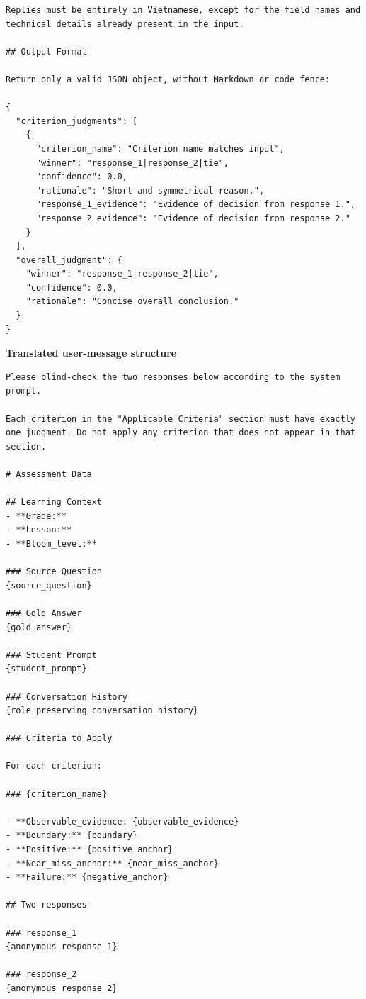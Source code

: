 \documentclass[conference]{IEEEtran}
\begin{document}
\begin{Verbatim}[breaklines=true,breakanywhere=true,fontsize=\footnotesize,formatcom=\rmfamily]
Replies must be entirely in Vietnamese, except for the field names and technical details already present in the input.

## Output Format

Return only a valid JSON object, without Markdown or code fence:

{
  "criterion_judgments": [
    {
      "criterion_name": "Criterion name matches input",
      "winner": "response_1|response_2|tie",
      "confidence": 0.0,
      "rationale": "Short and symmetrical reason.",
      "response_1_evidence": "Evidence of decision from response 1.",
      "response_2_evidence": "Evidence of decision from response 2."
    }
  ],
  "overall_judgment": {
    "winner": "response_1|response_2|tie",
    "confidence": 0.0,
    "rationale": "Concise overall conclusion."
  }
}
\end{Verbatim}
\noindent\textbf{Translated user-message structure}
\begin{Verbatim}[breaklines=true,breakanywhere=true,fontsize=\footnotesize,formatcom=\rmfamily]
Please blind-check the two responses below according to the system prompt.

Each criterion in the "Applicable Criteria" section must have exactly one judgment. Do not apply any criterion that does not appear in that section.

# Assessment Data

## Learning Context
- **Grade:**
- **Lesson:**
- **Bloom_level:**

### Source Question
{source_question}

### Gold Answer
{gold_answer}

### Student Prompt
{student_prompt}

### Conversation History
{role_preserving_conversation_history}

### Criteria to Apply

For each criterion:

### {criterion_name}

- **Observable_evidence: {observable_evidence}
- **Boundary:** {boundary}
- **Positive:** {positive_anchor}
- **Near_miss_anchor:** {near_miss_anchor}
- **Failure:** {negative_anchor}

## Two responses

### response_1
{anonymous_response_1}

### response_2
{anonymous_response_2}
\end{Verbatim}
\end{document}
